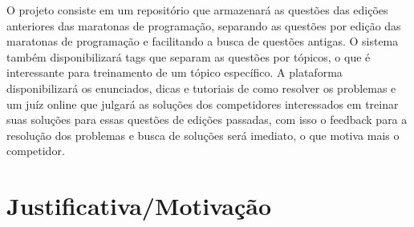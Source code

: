 O projeto consiste em um repositório que armazenará as questões das edições anteriores das maratonas de programação, separando as questões por edição das maratonas de programação e facilitando a busca de questões antigas. O sistema também disponibilizará tags que separam as questões por tópicos, o que é interessante para treinamento de um tópico específico. A plataforma disponibilizará os enunciados, dicas e tutoriais de como resolver os problemas e um juíz online que julgará as soluções dos competidores interessados em treinar suas soluções para essas questões de edições passadas, com isso o feedback para a resolução dos problemas e busca de soluções será imediato, o que motiva mais o competidor.


\section{Justificativa/Motivação}

